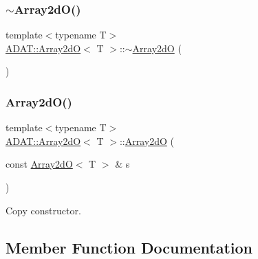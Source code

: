 \subsubsection{\texorpdfstring{$\sim$Array2dO()}{~Array2dO()}\hspace{0.1cm}{\footnotesize\ttfamily [2/2]}}
{\footnotesize\ttfamily template$<$typename T$>$ \\
\mbox{\hyperlink{classADAT_1_1Array2dO}{A\+D\+A\+T\+::\+Array2dO}}$<$ T $>$\+::$\sim$\mbox{\hyperlink{classADAT_1_1Array2dO}{Array2dO}} (\begin{DoxyParamCaption}{ }\end{DoxyParamCaption})\hspace{0.3cm}{\ttfamily [inline]}}

\mbox{\label{classADAT_1_1Array2dO_a9d759d2058e98b6ce4b2e1a373075bc0}} 
\subsubsection{\texorpdfstring{Array2dO()}{Array2dO()}\hspace{0.1cm}{\footnotesize\ttfamily [8/8]}}
{\footnotesize\ttfamily template$<$typename T$>$ \\
\mbox{\hyperlink{classADAT_1_1Array2dO}{A\+D\+A\+T\+::\+Array2dO}}$<$ T $>$\+::\mbox{\hyperlink{classADAT_1_1Array2dO}{Array2dO}} (\begin{DoxyParamCaption}\item[{const \mbox{\hyperlink{classADAT_1_1Array2dO}{Array2dO}}$<$ T $>$ \&}]{s }\end{DoxyParamCaption})\hspace{0.3cm}{\ttfamily [inline]}}



Copy constructor. 



\subsection{Member Function Documentation}
\mbox{\label{classADAT_1_1Array2dO_a68d75259fbc18eb14504e3b6d74f2484}} 
